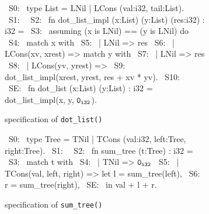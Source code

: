 \begin{figure}[H]\ContinuedFloat
\begin{subfigure}[b]{\textwidth}
\begin{center}
\begin{allLangEnvFoot}
~{\tiny \textcolor{mygray}{S0:\phantom{ }}}~ type List = LNil | LCons (val:i32, tail:List).
~{\tiny \textcolor{mygray}{S1:\phantom{ }}}~ 
~{\tiny \textcolor{mygray}{S2:\phantom{ }}}~ fn dot_list_impl (x:List) (y:List) (res:i32) : i32 =
~{\tiny \textcolor{mygray}{S3:\phantom{ }}}~   assuming (x is LNil) == (y is LNil) do
~{\tiny \textcolor{mygray}{S4:\phantom{ }}}~   match x with
~{\tiny \textcolor{mygray}{S5:\phantom{ }}}~   | LNil => res
~{\tiny \textcolor{mygray}{S6:\phantom{ }}}~   | LCons(xv, xrest) => match y with
~{\tiny \textcolor{mygray}{S7:\phantom{ }}}~                         | LNil => res
~{\tiny \textcolor{mygray}{S8:\phantom{ }}}~                         | LCons(yv, yrest) =>
~{\tiny \textcolor{mygray}{S9:\phantom{ }}}~                             dot_list_impl(xrest, yrest, res + xv * yv).
~{\tiny \textcolor{mygray}{S10:}}~ 
~{\tiny \textcolor{mygray}{SE:\phantom{ }}}~ fn dot_list (x:List) (y:List) : i32 = dot_list_impl(x, y, ${\tt 0_{i32}}$).
\end{allLangEnvFoot}
\end{center}
\caption{\SpecL{} specification of {\tt dot\_list()}}
\end{subfigure}
\begin{subfigure}[b]{\textwidth}
\begin{center}
\begin{allLangEnvFoot}
~{\tiny \textcolor{mygray}{S0:}}~ type Tree = TNil | TCons (val:i32, left:Tree, right:Tree).
~{\tiny \textcolor{mygray}{S1:}}~ 
~{\tiny \textcolor{mygray}{S2:}}~ fn sum_tree (t:Tree) : i32 =
~{\tiny \textcolor{mygray}{S3:}}~   match t with
~{\tiny \textcolor{mygray}{S4:}}~   | TNil => ${\tt 0_{i32}}$
~{\tiny \textcolor{mygray}{S5:}}~   | TCons(val, left, right) => let l = sum_tree(left),
~{\tiny \textcolor{mygray}{S6:}}~                                    r = sum_tree(right),
~{\tiny \textcolor{mygray}{SE:}}~                                in  val + l + r.
\end{allLangEnvFoot}
\end{center}
\caption{\SpecL{} specification of {\tt sum\_tree()}}
\end{subfigure}
\begin{subfigure}[b]{\textwidth}
\begin{center}
\begin{allLangEnvFoot}

\end{allLangEnvFoot}
\end{center}
\end{subfigure}
\end{figure}
